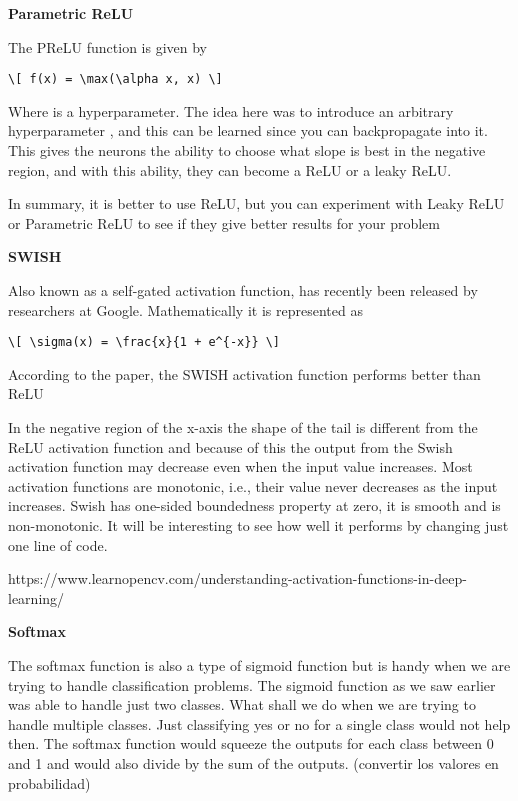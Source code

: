 \documentclass[11pt]{article}
\begin{document}
\textbf{Parametric ReLU}

The PReLU function is given by

\begin{verbatim}
\[ f(x) = \max(\alpha x, x) \]
\end{verbatim}

Where \alpha is a hyperparameter. The idea here was to introduce an
arbitrary hyperparameter \alpha, and this \alpha can be learned since
you can backpropagate into it. This gives the neurons the ability to
choose what slope is best in the negative region, and with this ability,
they can become a ReLU or a leaky ReLU.

In summary, it is better to use ReLU, but you can experiment with Leaky
ReLU or Parametric ReLU to see if they give better results for your
problem

\textbf{SWISH}

Also known as a self-gated activation function, has recently been
released by researchers at Google. Mathematically it is represented as

\begin{verbatim}
\[ \sigma(x) = \frac{x}{1 + e^{-x}} \]
\end{verbatim}

According to the paper, the SWISH activation function performs better
than ReLU

In the negative region of the x-axis the shape of the tail is different
from the ReLU activation function and because of this the output from
the Swish activation function may decrease even when the input value
increases. Most activation functions are monotonic, i.e., their value
never decreases as the input increases. Swish has one-sided boundedness
property at zero, it is smooth and is non-monotonic. It will be
interesting to see how well it performs by changing just one line of
code.

https://www.learnopencv.com/understanding-activation-functions-in-deep-learning/

\textbf{Softmax}

The softmax function is also a type of sigmoid function but is handy
when we are trying to handle classification problems. The sigmoid
function as we saw earlier was able to handle just two classes. What
shall we do when we are trying to handle multiple classes. Just
classifying yes or no for a single class would not help then. The
softmax function would squeeze the outputs for each class between 0 and
1 and would also divide by the sum of the outputs. (convertir los
valores en probabilidad)
\end{document}
